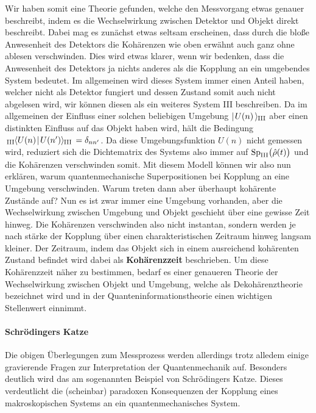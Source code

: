 Wir haben somit eine Theorie gefunden, welche den Messvorgang etwas genauer beschreibt, indem es die Wechselwirkung zwischen Detektor und Objekt direkt beschreibt. Dabei mag es zunächst etwas seltsam erscheinen, dass durch die bloße Anwesenheit des Detektors die Kohärenzen wie oben erwähnt auch ganz ohne ablesen verschwinden. Dies wird etwas klarer, wenn wir bedenken, dass die Anwesenheit des Detektors ja nichts anderes als die Kopplung an ein umgebendes System bedeutet. Im allgemeinen wird dieses System immer einen Anteil haben, welcher nicht als Detektor fungiert und dessen Zustand somit auch nicht abgelesen wird, wir können diesen als ein weiteres System III beschreiben. Da im allgemeinen der Einfluss einer solchen beliebigen Umgebung $\mid\!\!\!\,\,{\!\,U(n)\,}\rangle_{\!\!\;\text{III}}$ aber einen distinkten Einfluss auf das Objekt haben wird, hält die Bedingung $\braketIII{U(n)}{U(n')}=\delta_{nn'}$. Da diese Umgebungsfunktion $U(n)$ nicht gemessen wird, reduziert sich die Dichtematrix des Systems also immer auf $\text{Sp}_{\text{III}}\big(\hat{\rho}(t)\big)$ und die Kohärenzen verschwinden somit. Mit diesem Modell können wir also nun erklären, warum quantenmechanische Superpositionen bei Kopplung an eine Umgebung verschwinden. Warum treten dann aber überhaupt kohärente Zustände auf? Nun es ist zwar immer eine Umgebung vorhanden, aber die Wechselwirkung zwischen Umgebung und Objekt geschieht über eine gewisse Zeit hinweg. Die Kohärenzen verschwinden also nicht instantan, sondern werden je nach stärke der Kopplung über einen charakteristischen Zeitraum hinweg langsam kleiner. Der Zeitraum, indem das Objekt sich in einem ausreichend kohärenten Zustand befindet wird dabei als {\bf Kohärenzzeit} beschrieben. Um diese Kohärenzzeit näher zu bestimmen, bedarf es einer genaueren Theorie der Wechselwirkung zwischen Objekt und Umgebung, welche als Dekohärenztheorie bezeichnet wird und in der Quanteninformationstheorie einen wichtigen Stellenwert einnimmt. 


\paragraph{Schrödingers Katze}

Die obigen Überlegungen zum Messprozess werden allerdings trotz alledem einige gravierende Fragen zur Interpretation der Quantenmechanik auf. Besonders deutlich wird das am sogenannten Beispiel von Schrödingers Katze. Dieses verdeutlicht die (scheinbar) paradoxen Konsequenzen der Kopplung eines makroskopischen Systems an ein quantenmechanisches System. 

